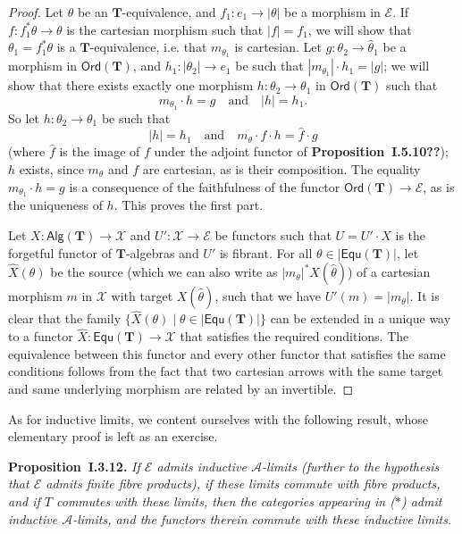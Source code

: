 \documentclass[fleqn]{article}
\newenvironment{itenv}[1]
  {\phantomsection\par\medskip\noindent\textbf{#1.}\itshape}
  {\par\medskip}
\newcommand{\oldpage}[1]{\marginpar{\footnotesize$\Big\vert$ \textit{p.~#1}}}
\newcommand{\unsure}[1]{{\color{purple}\textbf{#1}}}
\newcommand{\TT}{\mathbf{T}}
\newcommand{\textand}{\quad\text{and}\quad}
\newcommand{\cat}[1]{\mathcal{#1}}
\newcommand{\Cat}[1]{\mathsf{#1}}
\newcommand{\set}[1]{|#1|}
\newcommand{\Alg}[1]{\Cat{Alg}(#1)}
\newcommand{\Ord}[1]{\Cat{Ord}(#1)}
\newcommand{\Equ}[1]{\Cat{Equ}(#1)}
\begin{document}
\begin{proof}
  Let $\theta$ be an $\TT$-equivalence, and $f_1\colon e_1\to\set{\theta}$ be a morphism in $\cat{E}$.
  If $f\colon f_1^*\theta\to\theta$ is the cartesian morphism such that $\set{f}=f_1$, we will show that $\theta_1=f_1^*\theta$ is a $\TT$-equivalence, i.e. that $m_{\theta_1}$ is cartesian.
  \oldpage{242}
  Let $g\colon\theta_2\to\hat{\theta}_1$ be a morphism in $\Ord{\TT}$, and $h_1\colon\set{\theta_2}\to e_1$ be such that $\set{m_{\theta_1}}\cdot h_1=\set{g}$;
  we will show that there exists exactly one morphism $h\colon\theta_2\to\theta_1$ in $\Ord{\TT}$ such that
  \[
    m_{\theta_1}\cdot h = g
    \textand
    \set{h} = h_1.
  \]
  So let $h\colon\theta_2\to\theta_1$ be such that
  \[
    \set{h} = h_1
    \textand
    m_\theta\cdot f\cdot h = \hat{f}\cdot g
  \]
  (where $\hat{f}$ is the image of $f$ under the adjoint functor of \unsure{Proposition~I.5.10??});
  $h$ exists, since $m_\theta$ and $f$ are cartesian, as is their composition.
  The equality $m_{\theta_1}\cdot h=g$ is a consequence of the faithfulness of the functor $\Ord{\TT}\to\cat{E}$, as is the uniqueness of $h$.
  This proves the first part.

  Let $X\colon\Alg{\TT}\to\cat{X}$ and $U'\colon\cat{X}\to\cat{E}$ be functors such that $U=U'\cdot X$ is the forgetful functor of $\TT$-algebras and $U'$ is fibrant.
  For all $\theta\in\set{\Equ{\TT}}$, let $\hat{X}(\theta)$ be the source (which we can also write as $\set{m_\theta}^*X(\hat{\theta})$) of a cartesian morphism $m$ in $\cat{X}$ with target $X(\hat{\theta})$, such that we have $U'(m)=\set{m_\theta}$.
  It is clear that the family $\{\hat{X}(\theta)\mid\theta\in\set{\Equ{\TT}}\}$ can be extended in a unique way to a functor $\hat{X}\colon\Equ{\TT}\to\cat{X}$ that satisfies the required conditions.
  The equivalence between this functor and every other functor that satisfies the same conditions follows from the fact that two cartesian arrows with the same target and same underlying morphism are related by an invertible.
\end{proof}

As for inductive limits, we content ourselves with the following result, whose elementary proof is left as an exercise.

\begin{itenv}{Proposition~I.3.12}
  If $\cat{E}$ admits inductive $\cat{A}$-limits (further to the hypothesis that $\cat{E}$ admits finite fibre products), if these limits commute with fibre products, and if $T$ commutes with these limits, then the categories appearing in ($\ast$) admit inductive $\cat{A}$-limits, and the functors therein commute with these inductive limits.
\end{itenv}
\end{document}
